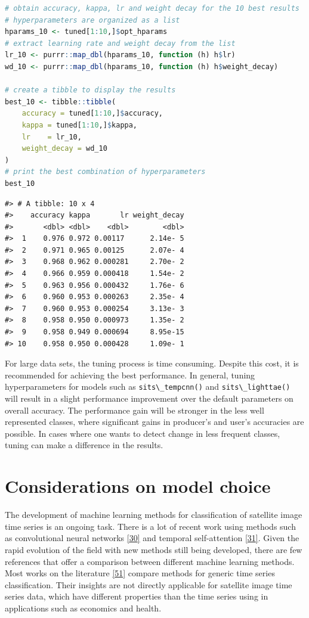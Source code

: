 \documentclass[
  11pt,
]{report}
\newcommand{\passthrough}[1]{#1}
\begin{document}
\begin{lstlisting}[language=R]
# obtain accuracy, kappa, lr and weight decay for the 10 best results
# hyperparameters are organized as a list
hparams_10 <- tuned[1:10,]$opt_hparams
# extract learning rate and weight decay from the list
lr_10 <- purrr::map_dbl(hparams_10, function (h) h$lr)
wd_10 <- purrr::map_dbl(hparams_10, function (h) h$weight_decay)

# create a tibble to display the results
best_10 <- tibble::tibble(
    accuracy = tuned[1:10,]$accuracy,
    kappa = tuned[1:10,]$kappa,
    lr    = lr_10,
    weight_decay = wd_10
)
# print the best combination of hyperparameters
best_10
\end{lstlisting}

\begin{lstlisting}
#> # A tibble: 10 x 4
#>    accuracy kappa       lr weight_decay
#>       <dbl> <dbl>    <dbl>        <dbl>
#>  1    0.976 0.972 0.00117      2.14e- 5
#>  2    0.971 0.965 0.00125      2.07e- 4
#>  3    0.968 0.962 0.000281     2.70e- 2
#>  4    0.966 0.959 0.000418     1.54e- 2
#>  5    0.963 0.956 0.000432     1.76e- 6
#>  6    0.960 0.953 0.000263     2.35e- 4
#>  7    0.960 0.953 0.000254     3.13e- 3
#>  8    0.958 0.950 0.000973     1.35e- 2
#>  9    0.958 0.949 0.000694     8.95e-15
#> 10    0.958 0.950 0.000428     1.09e- 1
\end{lstlisting}

For large data sets, the tuning process is time consuming. Despite this
cost, it is recommended for achieving the best performance. In general,
tuning hyperparameters for models such as
\passthrough{\lstinline!sits\_tempcnn()!} and
\passthrough{\lstinline!sits\_lighttae()!} will result in a slight
performance improvement over the default parameters on overall accuracy.
The performance gain will be stronger in the less well represented
classes, where significant gains in producer's and user's accuracies are
possible. In cases where one wants to detect change in less frequent
classes, tuning can make a difference in the results.

\hypertarget{considerations-on-model-choice}{%
\section*{Considerations on model
choice}\label{considerations-on-model-choice}}

The development of machine learning methods for classification of
satellite image time series is an ongoing task. There is a lot of recent
work using methods such as convolutional neural networks
\protect\hyperlink{ref-Fawaz2020}{{[}30{]}} and temporal self-attention
\protect\hyperlink{ref-Garnot2020a}{{[}31{]}}. Given the rapid evolution
of the field with new methods still being developed, there are few
references that offer a comparison between different machine learning
methods. Most works on the literature
\protect\hyperlink{ref-Fawaz2019}{{[}51{]}} compare methods for generic
time series classification. Their insights are not directly applicable
for satellite image time series data, which have different properties
than the time series using in applications such as economics and health.
\end{document}
